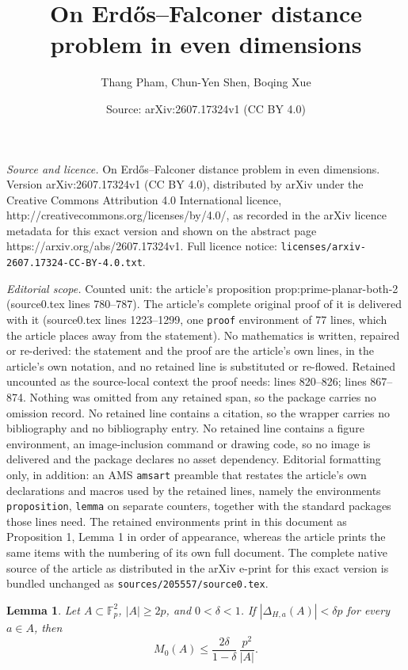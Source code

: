 \documentclass[10pt,a4paper]{amsart}
\title{On Erd\H{o}s--Falconer distance problem in even dimensions}
\author{Thang Pham, Chun-Yen Shen, Boqing Xue}
\date{Source: arXiv:2607.17324v1 (CC BY 4.0)}
\newtheorem{lemma}{Lemma}
\newcommand{\F}{\mathbb F}
\begin{document}
\maketitle

\noindent\emph{Source and licence.} On Erd\H{o}s--Falconer distance problem in even dimensions. Version arXiv:2607.17324v1 (CC BY 4.0), distributed by arXiv under the Creative Commons Attribution 4.0 International licence, http://creativecommons.org/licenses/by/4.0/, as recorded in the arXiv licence metadata for this exact version and shown on the abstract page https://arxiv.org/abs/2607.17324v1. Full licence notice: \texttt{licenses/arxiv-2607.17324-CC-BY-4.0.txt}.\par\smallskip

\noindent\textit{Editorial scope.} Counted unit: the article's proposition prop:prime-planar-both-2 (source0.tex lines 780--787). The article's complete original proof of it is delivered with it (source0.tex lines 1223--1299, one \texttt{proof} environment of 77 lines, which the article places away from the statement). No mathematics is written, repaired or re-derived: the statement and the proof are the article's own lines, in the article's own notation, and no retained line is substituted or re-flowed.  Retained uncounted as the source-local context the proof needs: lines 820--826; lines 867--874.  Nothing was omitted from any retained span, so the package carries no omission record.  No retained line contains a citation, so the wrapper carries no bibliography and no bibliography entry.  No retained line contains a figure environment, an image-inclusion command or drawing code, so no image is delivered and the package declares no asset dependency.  Editorial formatting only, in addition: an AMS \texttt{amsart} preamble that restates the article's own declarations and macros used by the retained lines, namely the environments \texttt{proposition}, \texttt{lemma} on separate counters, together with the standard packages those lines need.  The retained environments print in this document as Proposition 1, Lemma 1 in order of appearance, whereas the article prints the same items with the numbering of its own full document.  The complete native source of the article as distributed in the arXiv e-print for this exact version is bundled unchanged as \texttt{sources/205557/source0.tex}.
\begin{lemma}
\label{lem:split-fibre-pruning}
Let $A\subset\F_p^2$, $|A|\ge2p$, and $0<\delta<1$.  If $|\Delta_{H,a}(A)|<\delta p$ for every $a\in A$, then
\[
M_0(A)\le \frac{2\delta}{1-\delta}\,\frac{p^2}{|A|}.
\]
\end{lemma}
\end{document}

